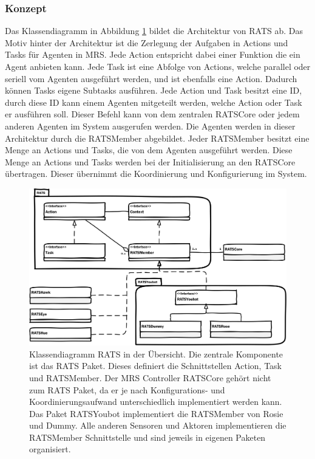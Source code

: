 \subsubsection{Konzept}
Das Klassendiagramm in Abbildung \ref{fig:classrats} bildet die Architektur von RATS ab. Das Motiv hinter der Architektur ist die Zerlegung der Aufgaben in Actions und Tasks für Agenten in MRS. Jede Action entspricht dabei einer Funktion die ein Agent anbieten kann. Jede Task ist eine Abfolge von Actions, welche parallel oder seriell vom Agenten ausgeführt werden, und ist ebenfalls eine Action. Dadurch können Tasks eigene Subtasks ausführen. Jede Action und Task besitzt eine ID, durch diese ID kann einem Agenten mitgeteilt werden, welche Action oder Task er ausführen soll. Dieser Befehl kann von dem zentralen RATSCore oder jedem anderen Agenten im System ausgerufen werden. Die Agenten werden in dieser Architektur durch die RATSMember abgebildet. Jeder RATSMember besitzt eine Menge an Actions und Tasks, die von dem Agenten ausgeführt werden. Diese Menge an Actions und Tasks werden bei der Initialisierung an den RATSCore übertragen. Dieser übernimmt die Koordinierung und Konfigurierung im System.

\begin{figure}
	\centering
	\includegraphics[scale=0.5]{fig/classrats}
	\caption[Klassenübersicht RATS]{Klassendiagramm RATS in der Übersicht. Die zentrale Komponente ist das RATS Paket. Dieses definiert die Schnittstellen Action, Task und RATSMember. Der MRS Controller RATSCore gehört nicht zum RATS Paket, da er je nach Konfigurations- und Koordinierungsaufwand unterschiedlich implementiert werden kann. Das Paket RATSYoubot implementiert die RATSMember von Rosie und Dummy. Alle anderen Sensoren und Aktoren implementieren die RATSMember Schnittstelle und sind jeweils in eigenen Paketen organisiert.}
	\label{fig:classrats}
\end{figure}


